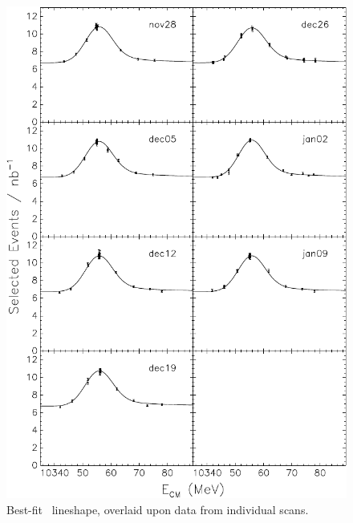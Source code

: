 \documentclass{cornell}
\begin{document}
\begin{figure}[p]
  \begin{center}
    \includegraphics[width=0.9\linewidth]{newnewplots/allscanssss}
  \end{center}
  \caption[Best-fit lineshape for each \usss\ scan]{\label{allscanssss} Best-fit \usss\ lineshape,
  overlaid upon data from individual scans.}
\end{figure}
\end{document}
